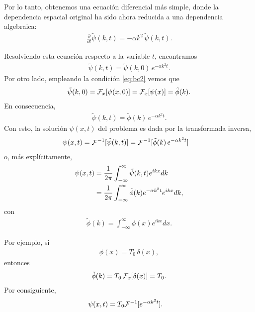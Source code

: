 Por lo tanto, obtenemos una ecuación diferencial más simple, donde la dependencia espacial original ha sido ahora reducida a una dependencia algebraica:
\begin{align}
\frac{\partial}{\partial t}\tilde{\psi}(k,t)=-\alpha k^2\, \tilde{\psi}(k,t).
\end{align}

Resolviendo esta ecuación respecto a la variable $t$, encontramos
\begin{align}
\tilde{\psi}(k,t)=\tilde{\psi}(k,0)\,e^{-\alpha k^2 t}.
\end{align}
Por otro lado, empleando la condición \eqref{eq:bc2} vemos que
\begin{align}
\tilde{\psi}(k,0) = {\cal F}_{x}[\psi(x,0)]={\cal F}_{x}[\psi(x)] =\tilde{\phi}(k).
\end{align}
En consecuencia,
\begin{align}
\tilde{\psi}(k,t)=\tilde{\phi}(k)\,e^{-\alpha k^2 t}.
\end{align}
Con esto, la solución $\psi(x,t)$ del problema es dada por la transformada inversa,
\begin{align}
\psi(x,t) &= {\cal F}^{-1}[\tilde{\psi}(k,t)]= {\cal F}^{-1}[\tilde{\phi}(k)\,e^{-\alpha k^2 t}]
\end{align}
o, más explícitamente,
\begin{align}
\psi(x,t) &= \frac{1}{2\pi}\int_{-\infty}^{\infty}\tilde{\psi}(k,t)e^{ikx} dk\notag \\
&= \frac{1}{2\pi}\int_{-\infty}^{\infty}\tilde{\phi}(k)e^{-\alpha k^2 t}e^{ikx} dk,
\end{align}
con
\begin{align}
\tilde{\phi}(k)=\int_{-\infty}^{\infty}\phi(x)e^{ikx}dx.
\end{align}

Por ejemplo, si
\begin{align}
\phi(x)=T_{0}\,\delta(x),
\end{align}
entonces
\begin{align}
\tilde{\phi}(k)=T_{0}\,{\cal F}_{x}[\delta(x)]=T_{0}.
\end{align}
Por consiguiente,
\begin{align}
\psi(x,t) &= T_{0}{\cal F}^{-1}[e^{-\alpha k^2 t}].
\end{align}


